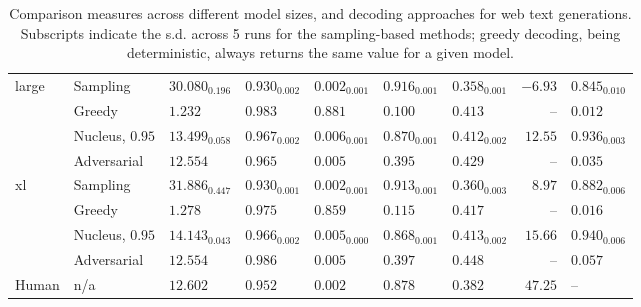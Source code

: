 \documentclass{article}
\theoremstyle{definition}
\newcommand{\tabemph}[1]{\cellcolor{lightmauve!30}\textcolor{black!50!royalazure}{#1}}%
\begin{document}
\begin{table}[t!]
\begin{adjustbox}{max width=\textwidth}
\begin{tabular}{lllllllrl}
\midrule
\multirow{4}{*}{large} & Sampling &           $30.080_{0.196}$ &           $0.930_{0.002}$ &  \tabemph{$\mathbf{0.002}_{0.001}$} &           $0.916_{0.001}$ &           $0.358_{0.001}$ &                $-6.93$ &            $0.845_{0.010}$ \\
      & Greedy &                    $1.232$ &                   $0.983$ &                   $0.881$ &                   $0.100$ &                   $0.413$ &       --          &                    $0.012$ \\
      & Nucleus, $0.95$ &  $13.499_{0.058}$ &  $0.967_{0.002}$ &           $0.006_{0.001}$ &           $0.870_{0.001}$ &           $0.412_{0.002}$ &             $12.55$ &            $0.936_{0.003}$ \\
      & Adversarial &           \tabemph{$\mathbf{12.554}$} &           $0.965$ &           $0.005$ &           $0.395$ &           $0.429$ &        -- &            $0.035$ \\
\midrule[0.03em]
\multirow{4}{*}{xl} & Sampling &           $31.886_{0.447}$ &           $0.930_{0.001}$ &           $0.002_{0.001}$ &           $0.913_{0.001}$ &           $0.360_{0.003}$ &            $8.97$ &            $0.882_{0.006}$ \\
      & Greedy &                    $1.278$ &                   $0.975$ &                   $0.859$ &                   $0.115$ &                   $0.417$ &               --        &                    $0.016$ \\
      & Nucleus, $0.95$ &           $14.143_{0.043}$ &           $0.966_{0.002}$ &           $0.005_{0.000}$ &           $0.868_{0.001}$ &           $0.413_{0.002}$ &      \tabemph{$\mathbf{15.66}$} &   \tabemph{$\mathbf{0.940}_{0.006}$} \\
      & Adversarial &           \tabemph{$\mathbf{12.554}$} &           $0.986$ &           $0.005$ &           $0.397$ &           $0.448$ &      -- &            $0.057$ \\
\midrule
Human &         n/a          &                   $12.602$ &                   $0.952$ &                   $0.002$ &                   $0.878$ &                   $0.382$ &         $47.25$ &            --                \\
\bottomrule
\end{tabular}
 \end{adjustbox}
\caption{Comparison measures across different model sizes, and decoding approaches for web text generations. 
Subscripts indicate the s.d. across 5 runs for the sampling-based methods; greedy decoding, being deterministic, always returns the same value for a given model.
}
\end{table}
\end{document}
